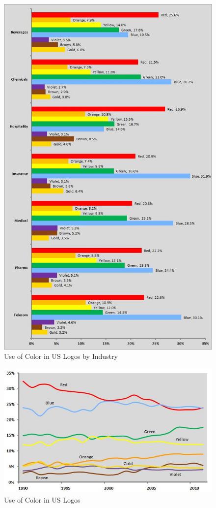 \begin{figure}[ht]
  \centering
  \includegraphics[width=.5\linewidth]{images/supplement/emblemetrics/colorindustry}
  \caption[]{Use of Color in US Logos by Industry}
  \label{fig:emblemetrics:color-industry}
\end{figure}

\begin{figure}[ht]
  \centering
  \includegraphics[width=.5\linewidth]{images/supplement/emblemetrics/color}
  \caption[]{Use of Color in US Logos}
  \label{fig:emblemetrics:color}
\end{figure}

